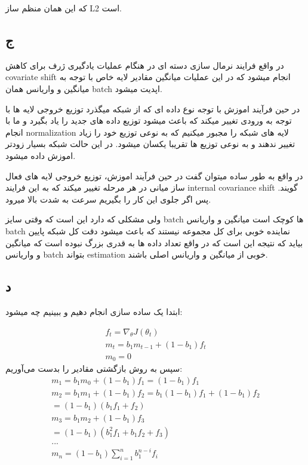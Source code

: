 \documentclass{article}[12pt]
\begin{document}
که این همان منظم ساز L2 است. 
\subsection{ج}


در واقع فرایند نرمال سازی دسته ای در هنگام عملیات یادگیری ژرف برای کاهش covariate shift انجام میشود که در این عملیات میانگین مقادیر لایه خاص با توجه به میانگین و واریانس همان batch اپدیت میشود. 

در حین فرآیند اموزش با توجه نوع داده ای که از شبکه میگذرد توزیع خروجی لایه ها با توجه به ورودی تغییر میکند که باعث میشود توزیع داده های جدید را یاد بگیرد و ما با انجام normalization لایه های شبکه را مجبور میکنیم که به نوعی توزیع خود را زیاد تغییر ندهند و به نوعی توزیع ها تقریبا یکسان میشود. در این حالت شبکه بسیار زودتر اموزش داده میشود. 

در واقع به طور ساده میتوان گفت در حین فرآیند اموزش، توزیع خروجی لایه های فعال ساز میانی در هر مرحله تغییر میکند که به این فرایند internal covariance shift گویند. پس اگر جلوی این کار را بگیریم سرعت به شدت بالا میرود. 

ولی مشکلی که دارد این است که وقتی سایز batch ها کوچک است میانگین و واریانس batch نماینده خوبی برای کل مجموعه نیستند که باعث میشود دقت کل شبکه پایین بیاید که نتیجه این است که در واقع تعداد داده ها به قدری بزرگ نبوده است که میانگین و واریانس batch بتواند estimation خوبی از میانگین و واریانس اصلی باشند. 
\subsection{د}
ابتدا یک ساده سازی انجام دهیم و ببینیم چه میشود: 

 \begin{gather*}
	f_{t} =\nabla _{\theta } J( \theta _{t})\\
	m_{t} =b_{1} m_{t-1} +( 1-b_{1}) f_{t}\\
	m_{0} =0
\end{gather*}
سپس به روش بازگشتی مقادیر را بدست می‌آوریم:
\begin{gather*}
		m_{1} =b_{1} m_{0} +( 1-b_{1}) f_{1} =( 1-b_{1}) f_{1}\\
		m_{2} =b_{1} m_{1} +( 1-b_{1}) f_{2} =b_{1}( 1-b_{1}) f_{1} +( 1-b_{1}) f_{2}\\
		=( 1-b_{1})( b_{1} f_{1} +f_{2})\\
		m_{3} =b_{1} m_{2} +( 1-b_{1}) f_{3}\\
		=( 1-b_{1})\left( b_{1}^{2} f_{1} +b_{1} f_{2} +f_{3}\right)\\
		...\\
		m_{n} =( 1-b_{1})\sum _{i=1}^{n} b_{1}^{n-i} f_{i}
\end{gather*}
\end{document}
